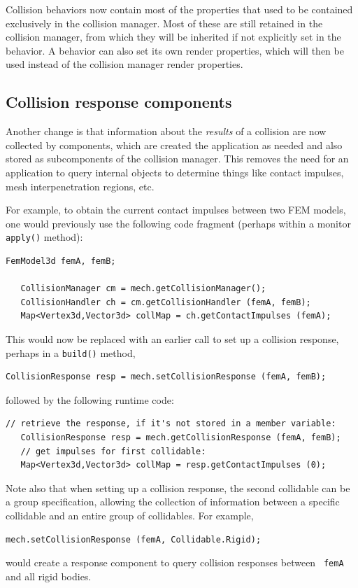 \documentclass{article}
\begin{document}
Collision behaviors now contain most of the properties that used to be
contained exclusively in the collision manager. Most of these are
still retained in the collision manager, from which they will be
inherited if not explicitly set in the behavior. A behavior can also
set its own render properties, which will then be used instead of the
collision manager render properties.

\subsection*{Collision response components}

Another change is that information about the {\it results} of a
collision are now collected by
 components,
which are created the application as needed and also stored as
subcomponents of the collision manager. This removes the need for an
application to query internal
 objects to
determine things like contact impulses, mesh interpenetration regions,
etc.

For example, to obtain the current contact impulses between two FEM
models, one would previously use the following code fragment (perhaps
within a monitor {\tt apply()} method):
%
\begin{lstlisting}[]
   FemModel3d femA, femB;
 
   CollisionManager cm = mech.getCollisionManager();
   CollisionHandler ch = cm.getCollisionHandler (femA, femB);
   Map<Vertex3d,Vector3d> collMap = ch.getContactImpulses (femA);
\end{lstlisting}
%
This would now be replaced with an earlier call to set up a collision
response, perhaps in a {\tt build()} method,
%
\begin{lstlisting}[]
   CollisionResponse resp = mech.setCollisionResponse (femA, femB);
\end{lstlisting}
%
followed by the following runtime code:
\begin{lstlisting}[]
   // retrieve the response, if it's not stored in a member variable:
   CollisionResponse resp = mech.getCollisionResponse (femA, femB);
   // get impulses for first collidable:
   Map<Vertex3d,Vector3d> collMap = resp.getContactImpulses (0);
\end{lstlisting}
%
Note also that when setting up a collision response, the second
collidable can be a group specification, allowing the collection of
information between a specific collidable and an entire
group of collidables.  For example,
%
\begin{lstlisting}[]
   mech.setCollisionResponse (femA, Collidable.Rigid);
\end{lstlisting}
%
would create a response component to query collision responses between {\tt
femA} and all rigid bodies.
\end{document}
